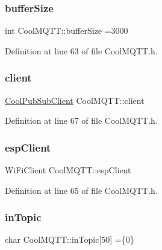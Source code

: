 \subsubsection{\texorpdfstring{buffer\+Size}{bufferSize}}
{\footnotesize\ttfamily int Cool\+M\+Q\+T\+T\+::buffer\+Size =3000\hspace{0.3cm}{\ttfamily [private]}}



Definition at line 63 of file Cool\+M\+Q\+T\+T.\+h.

\mbox{\label{class_cool_m_q_t_t_afed1372683c44893b4668d0f1771f514}} 
\subsubsection{\texorpdfstring{client}{client}}
{\footnotesize\ttfamily \hyperlink{class_cool_pub_sub_client}{Cool\+Pub\+Sub\+Client} Cool\+M\+Q\+T\+T\+::client\hspace{0.3cm}{\ttfamily [private]}}



Definition at line 67 of file Cool\+M\+Q\+T\+T.\+h.

\mbox{\label{class_cool_m_q_t_t_acc30a0200967374a524092a8a806502a}} 
\subsubsection{\texorpdfstring{esp\+Client}{espClient}}
{\footnotesize\ttfamily Wi\+Fi\+Client Cool\+M\+Q\+T\+T\+::esp\+Client\hspace{0.3cm}{\ttfamily [private]}}



Definition at line 65 of file Cool\+M\+Q\+T\+T.\+h.

\mbox{\label{class_cool_m_q_t_t_a4492f52a441e83cc5151010317fdb52d}} 
\subsubsection{\texorpdfstring{in\+Topic}{inTopic}}
{\footnotesize\ttfamily char Cool\+M\+Q\+T\+T\+::in\+Topic\mbox{[}50\mbox{]} =\{\textquotesingle{}0\textquotesingle{}\}\hspace{0.3cm}{\ttfamily [private]}}



